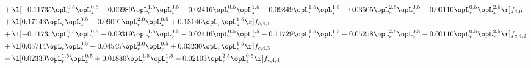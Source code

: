 \begin{alignat}{2}
& + \l[  -0.11735 \opL_r^{0.5} \opL_z^{0.5}   -0.06989 \opL_r^{1.5} \opL_z^{0.5}   -0.02416 \opL_r^{0.5} \opL_z^{1.5}   -0.09849 \opL_r^{1.5} \opL_z^{1.5}   -0.03505 \opL_r^{2.5} \opL_z^{0.5} +  0.00110 \opL_r^{0.5} \opL_z^{2.5}  \r] f_{4,0} \nonumber \\ 
& + \l[  0.17143 \opL_r \opL_z^{0.5} +  0.09091 \opL_r^{2.0} \opL_z^{0.5} +  0.13146 \opL_r \opL_z^{1.5}  \r] f_{c,4,1} \nonumber \\ 
& + \l[  -0.11735 \opL_r^{0.5} \opL_z^{0.5}   -0.09319 \opL_r^{1.5} \opL_z^{0.5}   -0.02416 \opL_r^{0.5} \opL_z^{1.5}   -0.11729 \opL_r^{1.5} \opL_z^{1.5}   -0.05258 \opL_r^{2.5} \opL_z^{0.5} +  0.00110 \opL_r^{0.5} \opL_z^{2.5}  \r] f_{c,4,2} \nonumber \\ 
& + \l[  0.05714 \opL_r \opL_z^{0.5} +  0.04545 \opL_r^{2.0} \opL_z^{0.5} +  0.03230 \opL_r \opL_z^{1.5}  \r] f_{c,4,3} \nonumber \\ 
& - \l[  0.02330 \opL_r^{1.5} \opL_z^{0.5} +  0.01880 \opL_r^{1.5} \opL_z^{1.5} +  0.02103 \opL_r^{2.5} \opL_z^{0.5}  \r] f_{c,4,4} \nonumber \\ 
\end{alignat} 


